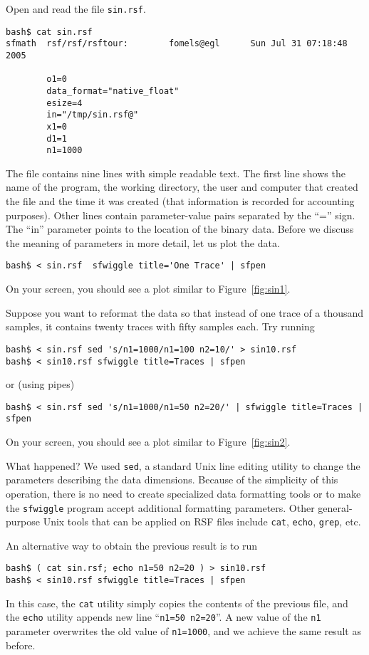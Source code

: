 Open and read the file \texttt{sin.rsf}.
\begin{verbatim}
bash$ cat sin.rsf
sfmath  rsf/rsf/rsftour:        fomels@egl      Sun Jul 31 07:18:48 2005

        o1=0
        data_format="native_float"
        esize=4
        in="/tmp/sin.rsf@"
        x1=0
        d1=1
        n1=1000
\end{verbatim}
The file contains nine lines with simple readable text. The first line
shows the name of the program, the working directory, the user and
computer that created the file and the time it was created (that
information is recorded for accounting purposes). Other lines contain
parameter-value pairs separated by the ``='' sign. The ``in''
parameter points to the location of the binary data. Before we discuss
the meaning of parameters in more detail, let us plot the data.
\begin{verbatim}
bash$ < sin.rsf  sfwiggle title='One Trace' | sfpen
\end{verbatim}
On your screen, you should see a plot similar to Figure~\ref{fig:sin1}.

 
Suppose you want to reformat the data so that instead of one trace of a
thousand samples, it contains twenty traces with fifty samples each. Try
running
\begin{verbatim}
bash$ < sin.rsf sed 's/n1=1000/n1=100 n2=10/' > sin10.rsf 
bash$ < sin10.rsf sfwiggle title=Traces | sfpen
\end{verbatim}
or (using pipes)
\begin{verbatim}
bash$ < sin.rsf sed 's/n1=1000/n1=50 n2=20/' | sfwiggle title=Traces | sfpen
\end{verbatim}
On your screen, you should see a plot similar to Figure~\ref{fig:sin2}.


What happened? We used \texttt{sed}, a standard Unix line editing utility to
change the parameters describing the data dimensions. Because of the
simplicity of this operation, there is no need to create specialized data
formatting tools or to make the \texttt{sfwiggle} program accept additional
formatting parameters. Other general-purpose Unix tools that can be applied on
RSF files include \texttt{cat}, \texttt{echo}, \texttt{grep}, etc. 

An alternative way to obtain the previous result is to run
\begin{verbatim}
bash$ ( cat sin.rsf; echo n1=50 n2=20 ) > sin10.rsf 
bash$ < sin10.rsf sfwiggle title=Traces | sfpen
\end{verbatim}
In this case, the \texttt{cat} utility simply copies the contents of the
previous file, and the \texttt{echo} utility appends new line ``\texttt{n1=50
  n2=20}''. A new value of the \texttt{n1} parameter overwrites the old value
of \texttt{n1=1000}, and we achieve the same result as before.

